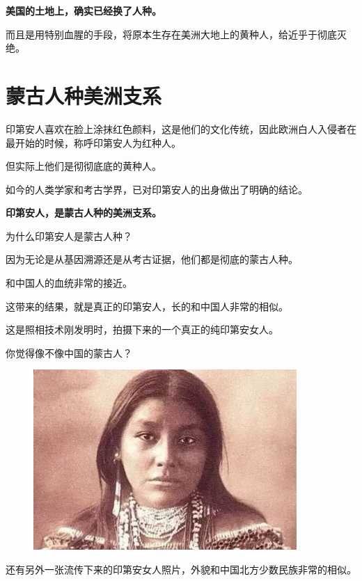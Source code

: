 \documentclass[UTF8, 11pt, oneside]{ctexart}
\newcommand{\zd}[1]{\textbf{\textcolor[RGB]{123,12,0}{#1}}} %
\newcommand{\biaoti}[1]{%
    \section*{#1}
}
\begin{document}
\zd{美国的土地上，确实已经换了人种。}

而且是用特别血腥的手段，将原本生存在美洲大地上的黄种人，给近乎于彻底灭绝。

\biaoti{蒙古人种美洲支系}

印第安人喜欢在脸上涂抹红色颜料，这是他们的文化传统，因此欧洲白人入侵者在最开始的时候，称呼印第安人为红种人。

但实际上他们是彻彻底底的黄种人。

如今的人类学家和考古学界，已对印第安人的出身做出了明确的结论。

\zd{印第安人，是蒙古人种的美洲支系。}

为什么印第安人是蒙古人种？

因为无论是从基因溯源还是从考古证据，他们都是彻底的蒙古人种。

和中国人的血统非常的接近。

这带来的结果，就是真正的印第安人，长的和中国人非常的相似。

这是照相技术刚发明时，拍摄下来的一个真正的纯印第安女人。

你觉得像不像中国的蒙古人？

\begin{figure}[H]
    \centering
    \includegraphics[width=10cm]{2023-10-13-002}
\end{figure}

还有另外一张流传下来的印第安女人照片，外貌和中国北方少数民族非常的相似。
\end{document}
